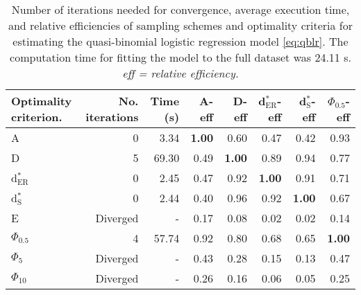 \begin{table}[htb!]
\centering
\caption{Number of iterations needed for convergence, average execution time, and relative efficiencies of sampling schemes and optimality criteria for estimating the quasi-binomial logistic regression model \eqref{eq:qblr}. The computation time for fitting the model to the full dataset was 24.11 s. \textit{eff = relative efficiency.}} 
\label{tab:impact_speed_response_surface}
\begin{tabular}{lrrrrrrr}
 Optimality criterion. & No. iterations & Time (s) & A-eff & D-eff & d$^*_{\mathrm{ER}}$-eff & d$^*_{\mathrm{S}}$-eff & $\Phi_{0.5}$-eff \\ 
  \hline
A & 0 & 3.34 & \textbf{1.00} & 0.60 & 0.47 & 0.42 & 0.93 \\ 
  D & 5 & 69.30 & 0.49 & \textbf{1.00} & 0.89 & 0.94 & 0.77 \\ 
  d$^*_{\mathrm{ER}}$ & 0 & 2.45 & 0.47 & 0.92 & \textbf{1.00} & 0.91 & 0.71 \\ 
  d$^*_{\mathrm{S}}$ & 0 & 2.44 & 0.40 & 0.96 & 0.92 & \textbf{1.00} & 0.67 \\ 
  E & Diverged & - & 0.17 & 0.08 & 0.02 & 0.02 & 0.14 \\ 
  $\Phi_{0.5}$ & 4 & 57.74 & 0.92 & 0.80 & 0.68 & 0.65 & \textbf{1.00} \\ 
  $\Phi_5$ & Diverged & - & 0.43 & 0.28 & 0.15 & 0.13 & 0.47 \\ 
  $\Phi_{10}$ & Diverged & - & 0.26 & 0.16 & 0.06 & 0.05 & 0.25 \\ 
   \hline
\end{tabular}
\end{table}
